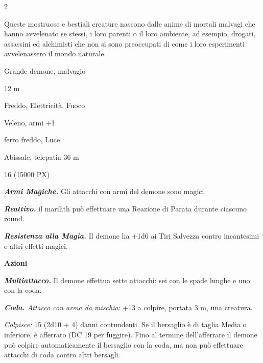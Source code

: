 \begin{multicols}{2}
{Queste mostruose e bestiali creature nascono dalle anime di mortali malvagi che hanno avvelenato se stessi, i loro parenti o il loro ambiente, ad esempio, drogati, assassini ed alchimisti che non si sono preoccupati di come i loro esperimenti avvelenassero il mondo naturale.

\begin{description}[noitemsep, topsep=0pt, parsep=0pt, partopsep=0pt, itemsep=1pt, leftmargin=2.35cm,  labelwidth=2.2cm, itemindent=0cm, listparindent=0pt] %
\setlength{\baselineskip}{10pt}
\item[\textbf{Taglia/Tipo}] Grande demone, malvagio
\item[\textbf{Caratt.}] 
\item[\textbf{Punti Ferita}] 
\item[\textbf{Movimento}] 12 m
\item[\textbf{Tiri Salvez.}] 
\item[\textbf{Res. Danni}] Freddo, Elettricità, Fuoco
\item[\textbf{Imm. Danni}] Veleno, armi +1
\item[\textbf{Vulnerabilità}] ferro freddo, Luce
\item[\textbf{Sensi}] 
\item[\textbf{Linguaggi}] Abissale, telepatia 36 m
\item[\textbf{Sfida}] 16 (15000 PX)
\end{description}
\smallskip

\emph{\textbf{Armi Magiche.}} Gli attacchi con armi del demone sono magici.

\emph{\textbf{Reattivo.}} il marilith può effettuare una Reazione di Parata durante ciascuno round.

\emph{\textbf{Resistenza alla Magia.}} Il demone ha +1d6 ai Tiri Salvezza contro incantesimi e altri effetti magici.

\textbf{Azioni}

\emph{\textbf{Multiattacco.}} Il demone effettua sette attacchi: sei con le spade lunghe e uno con la coda.

\emph{\textbf{Coda.} Attacco con arma da mischia}: +13 a colpire, portata 3 m, una creatura.

\emph{Colpisce:} 15 (2d10 + 4) danni contundenti. Se il bersaglio è di taglia Media o inferiore, è afferrato (DC 19 per fuggire). Fino al termine dell'afferrare il demone può colpire automaticamente il bersaglio con la coda, ma non può effettuare attacchi di coda contro altri bersagli.

}
\end{multicols}
